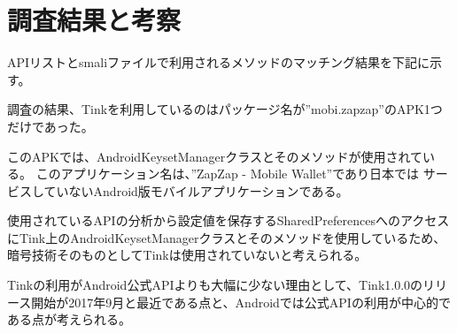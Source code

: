\newpage
\section{調査結果と考察}

APIリストとsmaliファイルで利用されるメソッドのマッチング結果を下記に示す。

調査の結果、Tinkを利用しているのはパッケージ名が”mobi.zapzap”のAPK1つだけであった。

このAPKでは、AndroidKeysetManagerクラスとそのメソッドが使用されている。
このアプリケーション名は、”ZapZap - Mobile Wallet”\cite{ZapZap}であり日本では
サービスしていないAndroid版モバイルアプリケーションである。

使用されているAPIの分析から設定値を保存するSharedPreferencesへのアクセスにTink上のAndroidKeysetManagerクラスとそのメソッドを使用しているため、
暗号技術そのものとしてTinkは使用されていないと考えられる。

Tinkの利用がAndroid公式APIよりも大幅に少ない理由として、Tink1.0.0のリリース開始が2017年9月と最近である点と、Androidでは公式APIの利用が中心的である点が考えられる。





